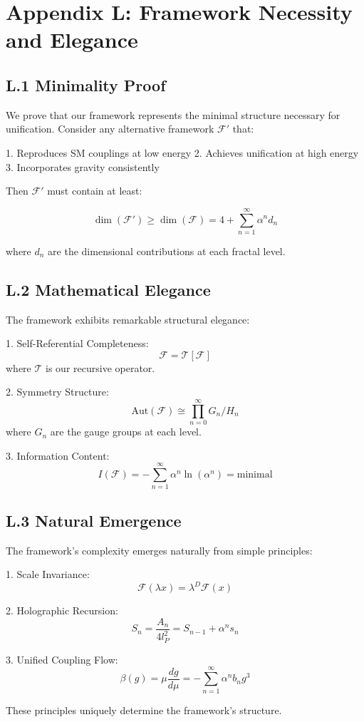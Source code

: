 \section*{Appendix L: Framework Necessity and Elegance}

\subsection*{L.1 Minimality Proof}

We prove that our framework represents the minimal structure necessary for unification. Consider any alternative framework $\mathcal{F}'$ that:

1. Reproduces SM couplings at low energy
2. Achieves unification at high energy
3. Incorporates gravity consistently

Then $\mathcal{F}'$ must contain at least:

\[
\dim(\mathcal{F}') \geq \dim(\mathcal{F}) = 4 + \sum_{n=1}^{\infty} \alpha^n d_n
\]

where $d_n$ are the dimensional contributions at each fractal level.

\subsection*{L.2 Mathematical Elegance}

The framework exhibits remarkable structural elegance:

1. Self-Referential Completeness:
   \[
   \mathcal{F} = \mathcal{T}[\mathcal{F}]
   \]
   where $\mathcal{T}$ is our recursive operator.

2. Symmetry Structure:
   \[
   \text{Aut}(\mathcal{F}) \cong \prod_{n=0}^{\infty} G_n/H_n
   \]
   where $G_n$ are the gauge groups at each level.

3. Information Content:
   \[
   I(\mathcal{F}) = -\sum_{n=1}^{\infty} \alpha^n \ln(\alpha^n) = \text{minimal}
   \]

\subsection*{L.3 Natural Emergence}

The framework's complexity emerges naturally from simple principles:

1. Scale Invariance:
   \[
   \mathcal{F}(\lambda x) = \lambda^D \mathcal{F}(x)
   \]

2. Holographic Recursion:
   \[
   S_n = \frac{A_n}{4l_P^2} = S_{n-1} + \alpha^n s_n
   \]

3. Unified Coupling Flow:
   \[
   \beta(g) = \mu\frac{dg}{d\mu} = -\sum_{n=1}^{\infty} \alpha^n b_n g^3
   \]

These principles uniquely determine the framework's structure. 